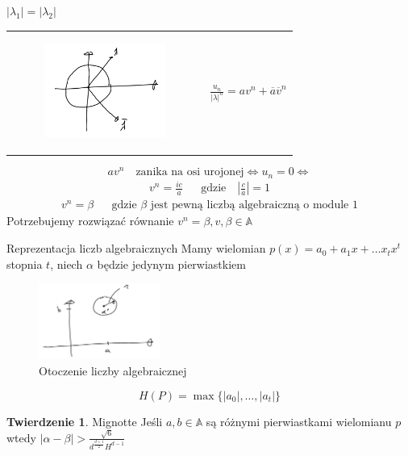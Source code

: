 \documentclass[handout]{beamer}
\def\A{\mathbb{A}}
\theoremstyle{definition}
\newtheorem*{twierdzenie}{Twierdzenie}
\begin{document}
\begin{frame}{$|\lambda_1| = |\lambda_2|$}
\begin{table}[]
    \centering
    \begin{tabular}{c c}
       \begin{figure}
            \centering
            \includegraphics[width=40mm]{img/Zaznaczenie_081.png}
        \end{figure}  & 
            $\frac{u_n}{|\lambda|^n} = a v^{n} + \overline{a} \overline{v} ^{n} $
 
    \end{tabular}
\end{table}

\begin{equation*}
    a v^{n} \quad  \text{zanika na osi urojonej} \iff u_n = 0 \iff 
\end{equation*}
\begin{align*}
    v^{n} = \frac{i c}{a} && \text{gdzie} \quad |\frac{c}{a}| = 1
\end{align*}
\begin{align*}
    v^{n} = \beta && \text{gdzie $\beta$ jest pewną liczbą algebraiczną o module 1}
\end{align*}
\pause
Potrzebujemy rozwiązać równanie $v^{n} = \beta, v, \beta \in \A$

\end{frame}

\begin{frame}{Reprezentacja liczb algebraicznych }
    Mamy wielomian $p(x) = a_0 + a_1 x + \ldots x_{t} x^{t}$ stopnia $t$, niech $\alpha$ będzie jedynym pierwiastkiem  
    \begin{figure}
        \centering
        \includegraphics[width=40mm]{img/Zaznaczenie_082.png}
        \caption{Otoczenie liczby algebraicznej}
        \label{fig:my_label}
    \end{figure}
    $$H(P) = \max \{ |a_0|, \ldots, |a_t| \}$$
    \begin{twierdzenie}{Mignotte}
            Jeśli $a,b \in \A$ są różnymi pierwiastkami wielomianu $p$ wtedy 
            $|\alpha - \beta| > \frac{\sqrt{6}}{d^{\frac{d+1}{2}} H^{d-1}}$
    \end{twierdzenie}
    
\end{frame}
\end{document}
